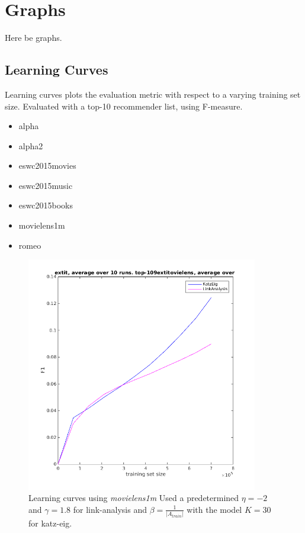 \chapter{Graphs}\label{cha:graphs}

Here be graphs.

\section{Learning Curves}\label{sec:learning_curves}

Learning curves plots the evaluation metric with respect to a varying training set size. Evaluated with a top-10 recommender list, using F-measure.

\begin{itemize}
    \item alpha
    \item alpha2
    \item eswc2015movies
    \item eswc2015music
    \item eswc2015books
    \item movielens1m
    \item romeo
\end{itemize}



\begin{figure}[h]
  \centering
    \includegraphics[width=0.9\textwidth]{fig/learning_curves/movielens_learning_curves.png}
    \caption{Learning curves using \textit{movielens1m}
        Used a predetermined $\eta = -2$ and $\gamma = 1.8$ for link-analysis and $\beta = \frac{1}{|A_{train}|}$ with the model $K = 30$ for katz-eig.}
\end{figure}

